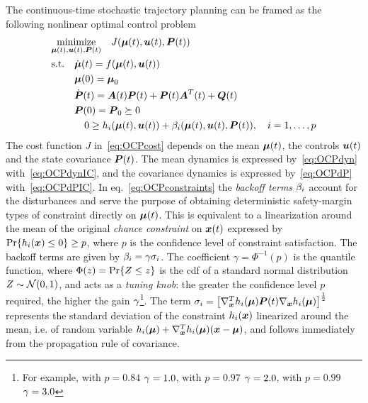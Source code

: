 The continuous-time stochastic trajectory planning can be framed as the following nonlinear optimal control problem
\begin{align}
& \underset{\bmu(t), \bu(t), \bP(t)}{\text{minimize}} \quad J(\bmu(t), \bu(t), \bP(t)) \label{eq:OCPcost} \\
& \text{s.t.} \quad \dbmu(t)           = f(\bmu(t), \bu(t)) \label{eq:OCPdyn} \\
& \phantom{\text{s.t.} \quad} \bmu(0)  = \bmu_0 \label{eq:OCPdynIC} \\
& \phantom{\text{s.t.} \quad} \dbP(t) = \bA(t) \bP(t) + \bP(t) \bA^T(t) + \bQ(t) \label{eq:OCPdP} \\
& \phantom{\text{s.t.} \quad} \bP(0)  = \bP_0 \succeq 0 \label{eq:OCPdPIC} \\ %
&\phantom{\text{s.t.} \qquad} 0       \geq h_i(\bmu(t), \bu(t))
+ \be_i(\bmu(t), \bu(t), \bP(t)),
\quad i = 1, \ldots, p \label{eq:OCPconstraints}
\end{align}
The cost function $J$ in~\eqref{eq:OCPcost} depends on the mean $\boldsymbol{\mu}(t)$, the controls $\boldsymbol{u}(t)$ and the state covariance $\boldsymbol{P}(t)$. The mean dynamics is expressed by~\eqref{eq:OCPdyn} with~\eqref{eq:OCPdynIC}, and the covariance dynamics is expressed by~\eqref{eq:OCPdP} with~\eqref{eq:OCPdPIC}. In eq.~\eqref{eq:OCPconstraints} the \emph{backoff terms} $\beta_i$ account for the disturbances and serve the purpose of obtaining deterministic safety-margin types of constraint directly on $\boldsymbol{\mu}(t)$. This is equivalent to a linearization around the mean of the original \emph{chance constraint} on $\boldsymbol{x}(t)$ expressed by $\operatorname{Pr} \{h_i(\boldsymbol{x}) \leq 0\}\geq p$, where $p$ is the confidence level of constraint satisfaction. The backoff terms are given by
$\beta_i = \gamma \sigma_i$. The coefficient $\gamma = \Phi^{-1}(p)$ is the quantile function, where $\Phi(z)=\operatorname{Pr} \{Z\leq z\}$ is the cdf of a standard normal distribution $Z \sim \mathcal{N}(0,1)$, and acts as a \emph{tuning knob}: the greater the confidence level $p$ required, the higher the gain $\gamma$\footnote{For example, with $p=0.84$ $\gamma = 1.0$, with $p=0.97$ $\gamma = 2.0$, with $p=0.99$ $\gamma = 3.0$}. The term $\sigma_i = \big[\nabla^T_{\boldsymbol{x}} h_i(\boldsymbol{\mu}) \boldsymbol{P}(t) \nabla_{\boldsymbol{x}} h_i(\boldsymbol{\mu})\big]^{\frac{1}{2}}$ represents the standard deviation of the constraint $h_i(\boldsymbol{x})$ linearized around the mean, i.e. of random variable $h_i(\boldsymbol{\mu})+\nabla^T_{\boldsymbol{x}} h_i(\boldsymbol{\mu}) (\boldsymbol{x} - \boldsymbol{\mu})$, and follows immediately from the propagation rule of covariance.


